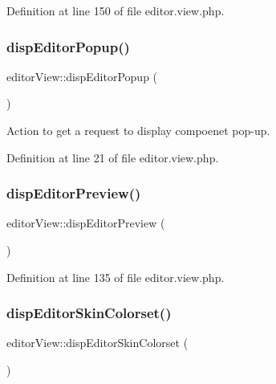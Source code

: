 Definition at line 150 of file editor.\+view.\+php.

\mbox{\label{classeditorView_aaa8f777f947452daa94610edc7dc4790}} 
\subsubsection{\texorpdfstring{disp\+Editor\+Popup()}{dispEditorPopup()}}
{\footnotesize\ttfamily editor\+View\+::disp\+Editor\+Popup (\begin{DoxyParamCaption}{ }\end{DoxyParamCaption})}



Action to get a request to display compoenet pop-\/up. 



Definition at line 21 of file editor.\+view.\+php.

\mbox{\label{classeditorView_a2e119bf18da5d6100ca7801967b09716}} 
\subsubsection{\texorpdfstring{disp\+Editor\+Preview()}{dispEditorPreview()}}
{\footnotesize\ttfamily editor\+View\+::disp\+Editor\+Preview (\begin{DoxyParamCaption}{ }\end{DoxyParamCaption})}



Definition at line 135 of file editor.\+view.\+php.

\mbox{\label{classeditorView_a5ef060fe6ef3a5e41a94a8c02cd2860c}} 
\subsubsection{\texorpdfstring{disp\+Editor\+Skin\+Colorset()}{dispEditorSkinColorset()}}
{\footnotesize\ttfamily editor\+View\+::disp\+Editor\+Skin\+Colorset (\begin{DoxyParamCaption}{ }\end{DoxyParamCaption})}



